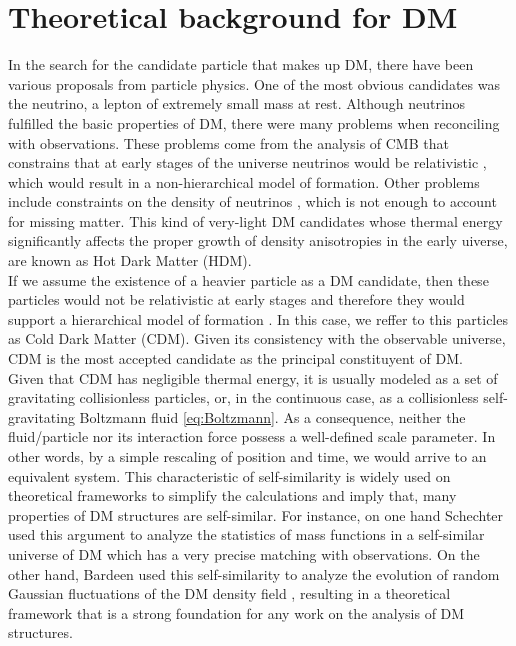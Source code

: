 \section{Theoretical background for DM}
In the search for the candidate particle that makes up DM, there have been various proposals from particle physics. One of the most obvious candidates was the neutrino, a lepton of extremely small mass at rest. Although neutrinos fulfilled the basic properties of DM, there were many problems when reconciling with observations. These problems come from the analysis of CMB that constrains that at early stages of the universe neutrinos would be relativistic \cite{Bond_et_al._1980,Bertone_et_al._2005}, which would result in a non-hierarchical model of formation. Other problems include constraints on the density of neutrinos \cite{WMAP_2003}, which is not enough to account for missing matter. This kind of very-light DM candidates whose thermal energy significantly affects the proper growth of density anisotropies in the early uiverse, are known as Hot Dark Matter (HDM).\\

If we assume the existence of a heavier particle as a DM candidate, then these particles would not be relativistic at early stages and therefore they would support a hierarchical model of formation \cite{Blumenthal_et_al._1984,Liddle_and_Lith_1993}. In this case, we reffer to this particles as Cold Dark Matter (CDM). Given its consistency with the observable universe, CDM is the most accepted candidate as the principal constituyent of DM.\\

Given that CDM has negligible thermal energy, it is usually modeled as a set of gravitating collisionless particles, or, in the continuous case, as a collisionless self-gravitating Boltzmann fluid \eqref{eq:Boltzmann}. As a consequence, neither the fluid/particle nor its interaction force possess a well-defined scale parameter. In other words, by a simple rescaling of position and time, we would arrive to an equivalent system. This characteristic of self-similarity is widely used on theoretical frameworks to simplify the calculations and imply that, many properties of DM structures are self-similar. For instance, on one hand Schechter used this argument to analyze the statistics of mass functions in a self-similar universe of DM \cite{Schechter_1976} which has a very precise matching with observations. On the other hand, Bardeen used this self-similarity to analyze the evolution of random Gaussian fluctuations of the DM density field \cite{Bardeen_1986}, resulting in a theoretical framework that is a strong foundation for any work on the analysis of DM structures.\\


